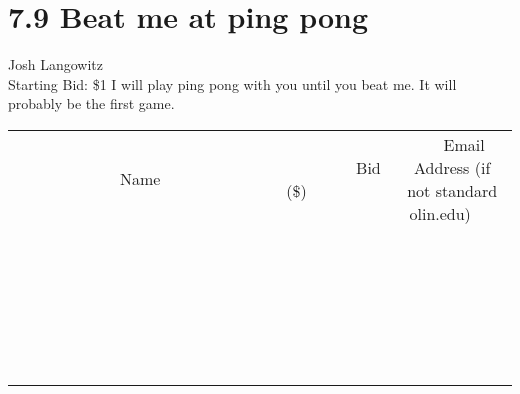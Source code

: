 \documentclass[11pt]{article}
\begin{document}
\section*{7.9 Beat me at ping pong}
Josh Langowitz
\\
Starting Bid: \$1
\newline
I will play ping pong with you until you beat me. It will probably be the first game.
\\[6ex]
\begin{tabular}{c c c}
~~~~~~~~~~~~~Name~~~~~~~~~~~~~ & ~~~~~~~~~Bid (\$)~~~~~~~~~  & ~~~Email Address (if not standard olin.edu)~~~\\
 & & \\
\hline
 & & \\
\hline
 & & \\
\hline
 & & \\
\hline
 & & \\
\hline
 & & \\
\hline
 & & \\
\hline
 & & \\
\hline
 & & \\
\hline
 & & \\
\hline
 & & \\
\hline
 & & \\
\hline
 & & \\
\hline
 & & \\
\hline
 & & \\
\hline
 & & \\
\hline
 & & \\
\hline
 & & \\
\hline
 & & \\
\hline
 & & \\
\hline
 & & \\
\hline
 & & \\
\hline
 & & \\
\hline
 & & \\
\hline
 & & \\
\hline
 & & \\
\hline
\end{tabular}
\newpage
\end{document}
